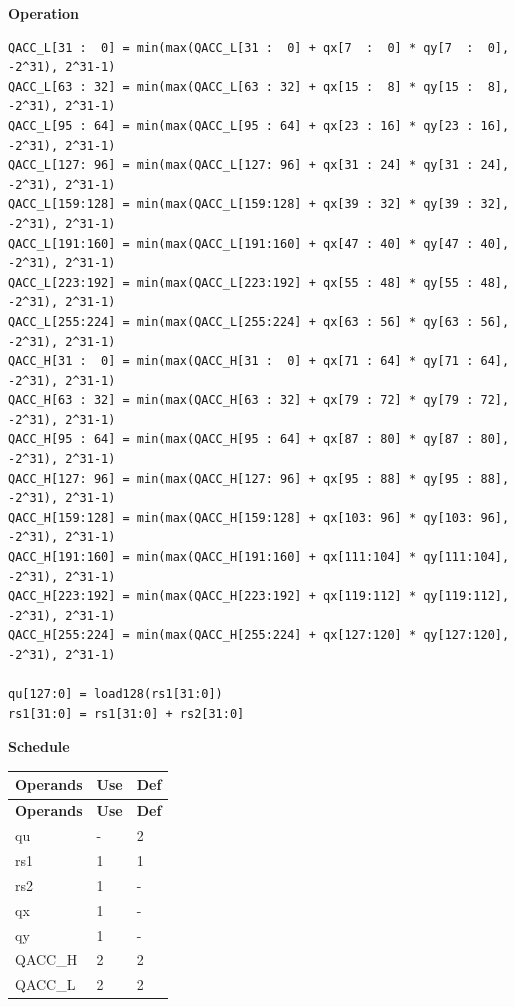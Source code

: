 \textbf{Operation}\\
\begin{lstlisting}
QACC_L[31 :  0] = min(max(QACC_L[31 :  0] + qx[7  :  0] * qy[7  :  0], -2^31), 2^31-1)
QACC_L[63 : 32] = min(max(QACC_L[63 : 32] + qx[15 :  8] * qy[15 :  8], -2^31), 2^31-1)
QACC_L[95 : 64] = min(max(QACC_L[95 : 64] + qx[23 : 16] * qy[23 : 16], -2^31), 2^31-1)
QACC_L[127: 96] = min(max(QACC_L[127: 96] + qx[31 : 24] * qy[31 : 24], -2^31), 2^31-1)
QACC_L[159:128] = min(max(QACC_L[159:128] + qx[39 : 32] * qy[39 : 32], -2^31), 2^31-1)
QACC_L[191:160] = min(max(QACC_L[191:160] + qx[47 : 40] * qy[47 : 40], -2^31), 2^31-1)
QACC_L[223:192] = min(max(QACC_L[223:192] + qx[55 : 48] * qy[55 : 48], -2^31), 2^31-1)
QACC_L[255:224] = min(max(QACC_L[255:224] + qx[63 : 56] * qy[63 : 56], -2^31), 2^31-1)
QACC_H[31 :  0] = min(max(QACC_H[31 :  0] + qx[71 : 64] * qy[71 : 64], -2^31), 2^31-1)
QACC_H[63 : 32] = min(max(QACC_H[63 : 32] + qx[79 : 72] * qy[79 : 72], -2^31), 2^31-1)
QACC_H[95 : 64] = min(max(QACC_H[95 : 64] + qx[87 : 80] * qy[87 : 80], -2^31), 2^31-1)
QACC_H[127: 96] = min(max(QACC_H[127: 96] + qx[95 : 88] * qy[95 : 88], -2^31), 2^31-1)
QACC_H[159:128] = min(max(QACC_H[159:128] + qx[103: 96] * qy[103: 96], -2^31), 2^31-1)
QACC_H[191:160] = min(max(QACC_H[191:160] + qx[111:104] * qy[111:104], -2^31), 2^31-1)
QACC_H[223:192] = min(max(QACC_H[223:192] + qx[119:112] * qy[119:112], -2^31), 2^31-1)
QACC_H[255:224] = min(max(QACC_H[255:224] + qx[127:120] * qy[127:120], -2^31), 2^31-1)

qu[127:0] = load128(rs1[31:0])
rs1[31:0] = rs1[31:0] + rs2[31:0]
\end{lstlisting}

\textbf{Schedule}\\
\begin{longtable}[c]{|l|l|l|}
    \hline
    \rowcolor{lightgray}
    \textbf{Operands} & \textbf{Use} & \textbf{Def} \\\hline
    \endfirsthead
    \hline
    \rowcolor{lightgray}
     \textbf{Operands} & \textbf{Use} & \textbf{Def} \\\hline
    \endhead
    \hline
    \endfoot

    qu & - & 2 \\\hline
    rs1 & 1 & 1 \\\hline
    rs2 & 1 & - \\\hline
     qx & 1 & - \\\hline
     qy & 1 & - \\\hline
     QACC\_H & 2 & 2 \\\hline
     QACC\_L & 2 & 2

\end{longtable}

